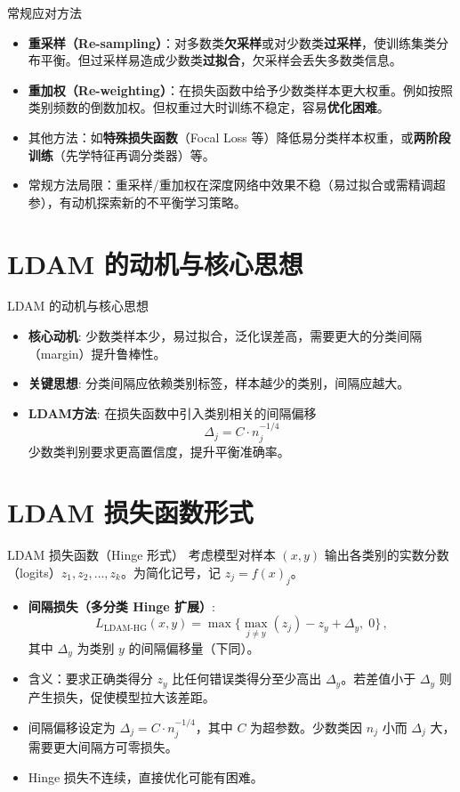 \documentclass{beamer}
\begin{document}
\begin{frame}{常规应对方法}
    \begin{itemize}
        \item \textbf{重采样（Re-sampling）}：对多数类\textbf{欠采样}或对少数类\textbf{过采样}，使训练集类分布平衡。但过采样易造成少数类\textbf{过拟合}，欠采样会丢失多数类信息。
        \item \textbf{重加权（Re-weighting）}：在损失函数中给予少数类样本更大权重。例如按照类别频数的倒数加权。但权重过大时训练不稳定，容易\textbf{优化困难}。
        \item 其他方法：如\textbf{特殊损失函数}（Focal Loss 等）降低易分类样本权重，或\textbf{两阶段训练}（先学特征再调分类器）等。
        \item 常规方法局限：重采样/重加权在深度网络中效果不稳（易过拟合或需精调超参），有动机探索新的不平衡学习策略。
    \end{itemize}
\end{frame}

\section{LDAM 的动机与核心思想}
\begin{frame}{LDAM 的动机与核心思想}
    \begin{itemize}
        \item \textbf{核心动机}: 少数类样本少，易过拟合，泛化误差高，需要更大的分类间隔（margin）提升鲁棒性。
        \item \textbf{关键思想}: 分类间隔应依赖类别标签，样本越少的类别，间隔应越大。
        \item \textbf{LDAM方法}: 在损失函数中引入类别相关的间隔偏移
        \[
            \Delta_j = C \cdot n_j^{-1/4}
        \]
        少数类判别要求更高置信度，提升平衡准确率。
    \end{itemize}
\end{frame}

\section{LDAM 损失函数形式}
\begin{frame}{LDAM 损失函数（Hinge 形式）}
    考虑模型对样本 $(x,y)$ 输出各类别的实数分数（logits）$z_1, z_2, \dots, z_k$。为简化记号，记 $z_j = f(x)_j$。
    \begin{itemize}
        \item \textbf{间隔损失（多分类 Hinge 扩展）}: 
        \[
            L_{\text{LDAM-HG}}(x,y) = \max\{\max_{j \neq y}(z_j) - z_y + \Delta_y,\;0\}\,,
        \] 
        其中 $\Delta_y$ 为类别 $y$ 的间隔偏移量（下同）。
        \item 含义：要求正确类得分 $z_y$ 比任何错误类得分至少高出 $\Delta_y$。若差值小于 $\Delta_y$ 则产生损失，促使模型拉大该差距。
        \item 间隔偏移设定为 $\displaystyle \Delta_j = C \cdot n_j^{-1/4}$，其中 $C$ 为超参数。少数类因 $n_j$ 小而 $\Delta_j$ 大，需要更大间隔方可零损失。
        \item Hinge 损失不连续，直接优化可能有困难。
    \end{itemize}
\end{frame}
\end{document}
